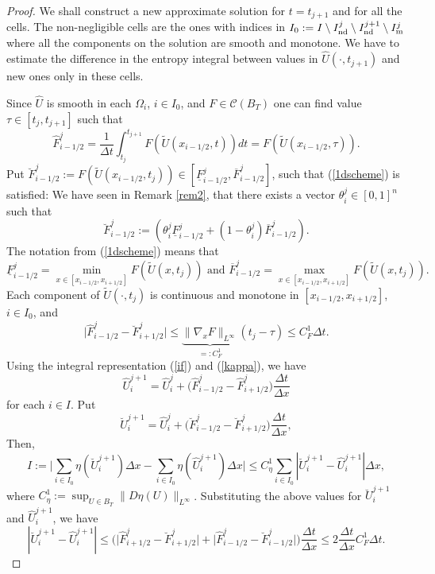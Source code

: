 \documentclass[11pt,a4paper,reqno]{amsart}
\theoremstyle{plain}
\theoremstyle{definition}
\theoremstyle{remark}
\numberwithin{equation}{section}
\begin{document}
{\begin{proof}
We shall construct a new approximate solution for $t=t_{j+1}$ 
and for all the cells. 
The non-negligible cells are the ones with indices in 
$I_{0}:=I \setminus I_{\rm nd}^{j} \setminus I_{\rm nd}^{j+1} 
\setminus I_{\rm m}^{j}$ where all the components on the solution are 
smooth and monotone.
We have to estimate the difference in the entropy integral
between values in $\widehat{U}(\cdot,t_{j+1})$ 
and new ones only in these cells.

Since $\hat{U}$ is smooth
in each $\Omega_{i}$, $i\in I_{0}$, and $F\in \mathcal{C}(B_{T})$ one can find value 
$\tau\in [t_{j},t_{j+1}]$ such that
$$\hat{F}_{i-1/2}^{j}=
\frac{1}{\Delta t} \int_{t_{j}}^{t_{j+1}}F(\widetilde{U}(x_{i-1/2},t))dt 
= F(\widetilde{U}(x_{i-1/2},\tau)).$$
Put
$\breve{F}_{i-1/2}^{j}:=F(\widetilde{U}(x_{i-1/2},t_{j}))\in 
[\underline{F}_{i-1/2}^{j},\overline{F}_{i-1/2}^{j}]$,
such that (\ref{1dscheme}) is satisfied: 
We have seen in Remark \ref{rem2}, that there exists a vector
$\theta_{i}^{j}\in [0,1]^{n}$ such that
\[
\breve{F}_{i-1/2}^{j}:=(\theta_{i}^{j}\underline{F}_{i-1/2}^{j}
+(1-\theta_{i}^{j})\overline{F}_{i-1/2}^{j}).
\]
The notation from (\ref{1dscheme}) means that
\[ 
\underline{F}_{i-1/2}^{j}=\min_{x\in[x_{i-1/2},x_{i+1/2}]} F(\widetilde{U}(x,t_{j})) \text{ and }
\overline{F}_{i-1/2}^{j}=\max_{x\in[x_{i-1/2},x_{i+1/2}]} F(\widetilde{U}(x,t_{j})).
\]
Each component of $\widetilde{U}(\cdot,t_{j})$ is continuous and monotone
in $[x_{i-1/2},x_{i+1/2}]$, $i\in I_{0}$, and 
$$
\Big| \hat{F}_{i-1/2}^{j} - \breve{F}_{i+1/2}^{j} \Big|
\leq \underbrace{\| \nabla_{x} F\|_{L^{\infty}}}_{=:C_{F}^{1}}(t_{j}-\tau)
\leq C_{F}^{1} \Delta t.
$$
Using the integral representation (\ref{if}) and (\ref{kappa}), we have
\[ 
\widehat{U}_{i}^{j+1}=\widehat{U}_{i}^{j}+\big( \widehat{F}_{i-1/2}^{j}-\widehat{F}_{i+1/2}^{j} \big)
\frac{\Delta t}{\Delta x}
\]
for each $i\in I$. Put
\[ 
\breve{U}_{i}^{j+1}=\widehat{U}_{i}^{j}+\big( \breve{F}_{i-1/2}^{j}-\breve{F}_{i+1/2}^{j} \big)
\frac{\Delta t}{\Delta x},
\]
Then,
\[
I:= \Big| \sum_{i\in I_{0}}\eta(\breve{U}_{i}^{j+1})\Delta x
-\sum_{i\in I_{0}}\eta(\widehat{U}_{i}^{j+1})\Delta x
\Big| \leq C_{\eta}^{1} \sum_{i\in I_{0}} 
| \breve{U}_{i}^{j+1} - \widehat{U}_{i}^{j+1} | \Delta x,
\]
where $C_{\eta}^{1}:=\sup_{U\in B_{T}}\|D\eta (U)\|_{L^{\infty}}$.
Substituting the above values for $\breve{U}_{i}^{j+1}$ and $\widehat{U}_{i}^{j+1}$, we have
\[
| \breve{U}_{i}^{j+1} - \widehat{U}_{i}^{j+1} | \leq  
\big( \big|\widehat{F}_{i+1/2}^{j}-\breve{F}_{i+1/2}^{j}\big| 
+\big|\widehat{F}_{i-1/2}^{j}-\breve{F}_{i-1/2}^{j}\big|\big) 
\frac{\Delta t}{\Delta x} \leq 2\frac{\Delta t}{\Delta x}C_{F}^{1}\Delta t.
\]
\end{proof}}
\end{document}
